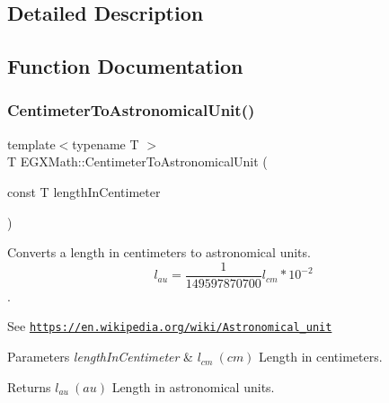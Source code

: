 \subsection{Detailed Description}


\subsection{Function Documentation}
\mbox{\label{group___e_g_x_math-_conversions-_length_conversions-_s_i-_centimeter-_astronomical_gaa8152adbb5be9ad80f2495646bbf316d}} 
\subsubsection{\texorpdfstring{Centimeter\+To\+Astronomical\+Unit()}{CentimeterToAstronomicalUnit()}}
{\footnotesize\ttfamily template$<$typename T $>$ \\
T E\+G\+X\+Math\+::\+Centimeter\+To\+Astronomical\+Unit (\begin{DoxyParamCaption}\item[{const T}]{length\+In\+Centimeter }\end{DoxyParamCaption})}



Converts a length in centimeters to astronomical units. \[ l_{au}= \frac{1}{149597870700} l_{cm} * 10^{-2} \]. 

See \href{https://en.wikipedia.org/wiki/Astronomical_unit}{\tt https\+://en.\+wikipedia.\+org/wiki/\+Astronomical\+\_\+unit} 
\begin{DoxyParams}{Parameters}
{\em length\+In\+Centimeter} & $ l_{cm}\ (cm)$ Length in centimeters. \\
\hline
\end{DoxyParams}
\begin{DoxyReturn}{Returns}
$ l_{au}\ (au)$ Length in astronomical units. 
\end{DoxyReturn}
\mbox{\label{group___e_g_x_math-_conversions-_length_conversions-_s_i-_centimeter-_astronomical_ga99b5eb487ffbb3d89497999b562ea77e}} 
